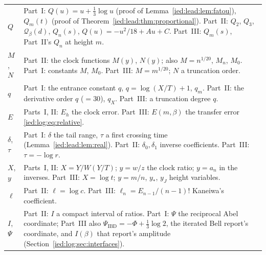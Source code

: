 \documentclass[11pt,letterpaper]{article}
\theoremstyle{remark}\newtheorem{remark}[theorem]{Remark}
\begin{document}
\begin{longtable}{@{}>{\raggedright\arraybackslash}p{} >{\raggedright\arraybackslash}p{}@{}}
$Q$ & Part~I: $Q(u)=u+\frac13\log u$ (proof of Lemma~\ref{ied:lead:lem:fatou}), $Q_m(t)$ (proof of Theorem~\ref{ied:lead:thm:proportional}). Part~II: $Q_2$, $Q_3$, $\mathcal Q_\beta(d)$, $Q_n(s)$, $Q(u)=-u^2/18+Au+C$. Part~III: $Q_m(s)$, Part~II's $Q_n$ at height $m$.\\
$M$, $N$ & Part~II: the clock functions $M(y)$, $N(y)$; also $M=n^{1/20}$, $M_n$, $M_0$. Part~I: constants $M$, $M_0$. Part~III: $M=m^{1/20}$; $N$ a truncation order.\\
$q$ & Part~I: the entrance constant $q$, $q=\log(X/T)+1$, $q_m$. Part~II: the derivative order $q$ ($=30$), $q_X$. Part~III: a truncation degree $q$.\\
$E$ & Parts~I, II: $E_h$ the clock error. Part~III: $E(m,\beta)$ the transfer error \eqref{ied:log:eq:relative}.\\
$\delta$, $\tau$ & Part~I: $\delta$ the tail range, $\tau$ a first crossing time (Lemma~\ref{ied:lead:lem:real}). Part~II: $\delta_0,\delta_1$ inverse coefficients. Part~III: $\tau=-\log r$.\\
$X$, $y$ & Parts~I, II: $X=Y/W(Y/T)$; $y=w/z$ the clock ratio; $y=a_n$ in the inverses. Part~III: $X=\log t$; $y=m/n$, $y_*$, $y_J$ height variables.\\
$\ell$ & Part~II: $\ell=\log c$. Part~III: $\ell_n=E_{n-1}/(n-1)!$ Kaneiwa's coefficient.\\
$I$, $\Psi$ & Part~II: $I$ a compact interval of ratios. Part~I: $\Psi$ the reciprocal Abel coordinate; Part~III also $\Psi_{\mathrm{IBD}}=-\Phi+\frac13\log2$, the iterated Bell report's coordinate, and $I(\beta)$ that report's amplitude (Section~\ref{ied:log:sec:interfaces}).\\
\bottomrule
\end{longtable}
\addtocounter{table}{-1}%
\endgroup
\end{document}
